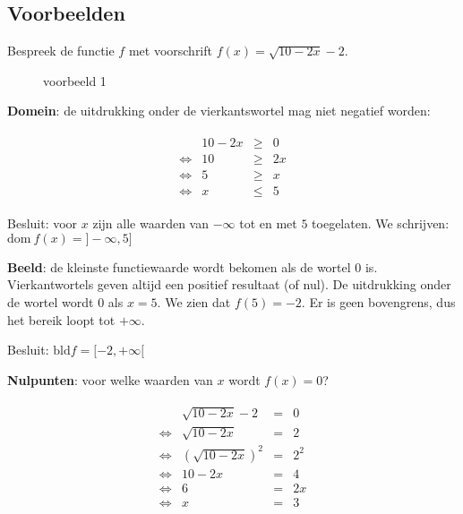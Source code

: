 \subsection{Voorbeelden}

\begin{voorbeeld}
	Bespreek de functie $f$ met voorschrift $f(x)=\sqrt{10-2x}-2$.


\begin{figure}
	\centering          
	
	\caption{voorbeeld 1}
\label{fig:reele_functies_vb1}	
\end{figure}



\textbf{Domein}: de uitdrukking onder de vierkantswortel
mag niet negatief worden:


\begin{eqnarray*}
	\begin{array}{cccc}
		& 10-2x & \geqslant & 0\\
		\iff & 10 & \geqslant & 2x\\
		\iff & 5 & \geqslant & x\\
		\iff & x & \leqslant & 5
	\end{array}
\end{eqnarray*}


Besluit: voor $x$ zijn alle waarden van $-\infty$ tot
en met $5$ toegelaten. We schrijven: $\textrm{dom}\ f(x)=]-\infty,5]$ 

\textbf{Beeld}: de kleinste functiewaarde wordt
bekomen als de wortel $0$ is. Vierkantwortels geven altijd een positief
resultaat (of nul). De uitdrukking onder de wortel wordt $0$ als
$x=5$. We zien dat $f(5)=-2$. Er is geen bovengrens, dus het bereik
loopt tot $+\infty$.

Besluit: $\textrm{bld}f=[-2,+\infty[$




\textbf{Nulpunten}: voor welke waarden van $x$ wordt $f(x)=0$?


\begin{eqnarray*}
	\begin{array}{cccc}
		& \sqrt{10-2x}-2 & = & 0\\
		\iff & \sqrt{10-2x} & = & 2\\
		\iff & \left(\sqrt{10-2x}\right)^{2} & = & 2^{2}\\
		\iff & 10-2x & = & 4\\
		\iff & 6 & = & 2x\\
		\iff & x & = & 3
	\end{array}
\end{eqnarray*}



\end{voorbeeld}
